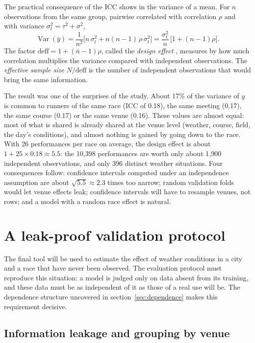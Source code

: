 \documentclass[11pt,a4paper]{article}
\DeclareMathOperator{\Var}{Var}
\begin{document}
The practical consequence of the ICC shows in the variance of a mean. For $n$ observations from the same group,
pairwise correlated with correlation $\rho$ and with variance $\sigma_t^2 = \tau^2 + \sigma^2$,
\[
\Var(\bar y) = \frac{1}{n^2}\Big[n\,\sigma_t^2 + n(n-1)\,\rho\,\sigma_t^2\Big] = \frac{\sigma_t^2}{n}\,
\big[1 + (n - 1)\rho\big].
\]
The factor $\mathrm{deff} = 1 + (\bar n - 1)\rho$, called the \emph{design effect} \citep{kish1965}, measures by how
much correlation multiplies the variance compared with independent observations. The \emph{effective sample size}
$N/\mathrm{deff}$ is the number of independent observations that would bring the same information.

The result was one of the surprises of the study. About 17\% of the variance of $y$ is common to runners of the same
race (ICC of 0.18), the same meeting (0.17), the same course (0.17) or the same venue (0.16). These values are almost
equal: most of what is shared is already shared at the venue level (weather, course, field, the day's conditions),
and almost nothing is gained by going down to the race. With 26 performances per race on average, the design effect is
about $1 + 25 \times 0.18 \approx 5.5$: the 10,398 performances are worth only about 1,900 independent observations,
and only 396 distinct weather situations. Four consequences follow: confidence intervals computed under an
independence assumption are about $\sqrt{5.5} \approx 2.3$ times too narrow; random validation folds would let venue
effects leak; confidence intervals will have to resample venues, not rows; and a model with a random race effect is
natural.

\section{A leak-proof validation protocol}\label{sec:validation}

The final tool will be used to estimate the effect of weather conditions in a city and a race that have never been
observed. The evaluation protocol must reproduce this situation: a model is judged only on data absent from its
training, and these data must be as independent of it as those of a real use will be. The dependence structure
uncovered in section~\ref{sec:dependence} makes this requirement decisive.

\subsection{Information leakage and grouping by venue}\label{sec:leakage}
\end{document}

